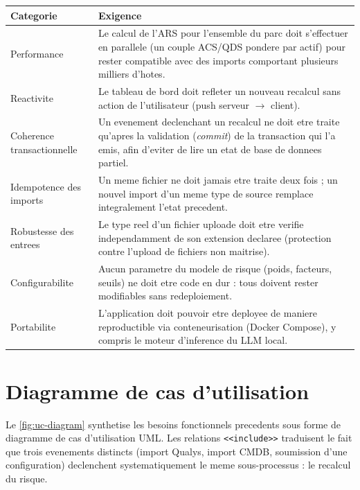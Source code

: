 \begin{longtable}{@{}p{2.6cm}p{10.2cm}@{}}
\toprule
\textbf{Categorie} & \textbf{Exigence} \\
\midrule
\endhead
Performance & Le calcul de l'ARS pour l'ensemble du parc doit s'effectuer en
parallele (un couple ACS/QDS pondere par actif) pour rester compatible avec des
imports comportant plusieurs milliers d'hotes. \\
Reactivite & Le tableau de bord doit refleter un nouveau recalcul sans action de
l'utilisateur (push serveur $\to$ client). \\
Coherence transactionnelle & Un evenement declenchant un recalcul ne doit etre traite
qu'apres la validation (\emph{commit}) de la transaction qui l'a emis, afin d'eviter
de lire un etat de base de donnees partiel. \\
Idempotence des imports & Un meme fichier ne doit jamais etre traite deux fois ; un
nouvel import d'un meme type de source remplace integralement l'etat precedent. \\
Robustesse des entrees & Le type reel d'un fichier uploade doit etre verifie
independamment de son extension declaree (protection contre l'upload de fichiers non
maitrise). \\
Configurabilite & Aucun parametre du modele de risque (poids, facteurs, seuils) ne
doit etre code en dur : tous doivent rester modifiables sans redeploiement. \\
Portabilite & L'application doit pouvoir etre deployee de maniere reproductible via
conteneurisation (Docker Compose), y compris le moteur d'inference du LLM local. \\
\bottomrule
\end{longtable}

\section{Diagramme de cas d'utilisation}

Le \cref{fig:uc-diagram} synthetise les besoins fonctionnels precedents sous forme de
diagramme de cas d'utilisation UML. Les relations \texttt{<<include>>} traduisent le
fait que trois evenements distincts (import Qualys, import CMDB, soumission d'une
configuration) declenchent systematiquement le meme sous-processus : le recalcul du
risque.

